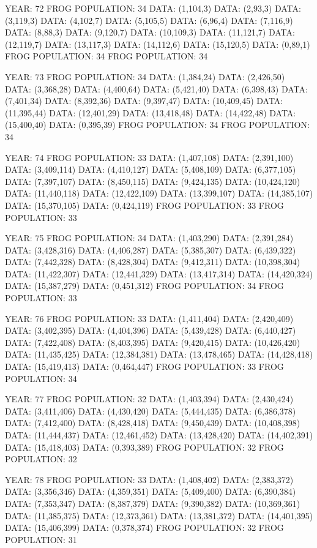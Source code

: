 \documentclass[12pt,a4paper]{article}
\begin{document}
{YEAR: 72
FROG POPULATION: 34
DATA: (1,104,3)
DATA: (2,93,3)
DATA: (3,119,3)
DATA: (4,102,7)
DATA: (5,105,5)
DATA: (6,96,4)
DATA: (7,116,9)
DATA: (8,88,3)
DATA: (9,120,7)
DATA: (10,109,3)
DATA: (11,121,7)
DATA: (12,119,7)
DATA: (13,117,3)
DATA: (14,112,6)
DATA: (15,120,5)
DATA: (0,89,1)
FROG POPULATION: 34
FROG POPULATION: 34

YEAR: 73
FROG POPULATION: 34
DATA: (1,384,24)
DATA: (2,426,50)
DATA: (3,368,28)
DATA: (4,400,64)
DATA: (5,421,40)
DATA: (6,398,43)
DATA: (7,401,34)
DATA: (8,392,36)
DATA: (9,397,47)
DATA: (10,409,45)
DATA: (11,395,44)
DATA: (12,401,29)
DATA: (13,418,48)
DATA: (14,422,48)
DATA: (15,400,40)
DATA: (0,395,39)
FROG POPULATION: 34
FROG POPULATION: 34

YEAR: 74
FROG POPULATION: 33
DATA: (1,407,108)
DATA: (2,391,100)
DATA: (3,409,114)
DATA: (4,410,127)
DATA: (5,408,109)
DATA: (6,377,105)
DATA: (7,397,107)
DATA: (8,450,115)
DATA: (9,424,135)
DATA: (10,424,120)
DATA: (11,440,118)
DATA: (12,422,109)
DATA: (13,399,107)
DATA: (14,385,107)
DATA: (15,370,105)
DATA: (0,424,119)
FROG POPULATION: 33
FROG POPULATION: 33

YEAR: 75
FROG POPULATION: 34
DATA: (1,403,290)
DATA: (2,391,284)
DATA: (3,428,316)
DATA: (4,406,287)
DATA: (5,385,307)
DATA: (6,439,322)
DATA: (7,442,328)
DATA: (8,428,304)
DATA: (9,412,311)
DATA: (10,398,304)
DATA: (11,422,307)
DATA: (12,441,329)
DATA: (13,417,314)
DATA: (14,420,324)
DATA: (15,387,279)
DATA: (0,451,312)
FROG POPULATION: 34
FROG POPULATION: 33

YEAR: 76
FROG POPULATION: 33
DATA: (1,411,404)
DATA: (2,420,409)
DATA: (3,402,395)
DATA: (4,404,396)
DATA: (5,439,428)
DATA: (6,440,427)
DATA: (7,422,408)
DATA: (8,403,395)
DATA: (9,420,415)
DATA: (10,426,420)
DATA: (11,435,425)
DATA: (12,384,381)
DATA: (13,478,465)
DATA: (14,428,418)
DATA: (15,419,413)
DATA: (0,464,447)
FROG POPULATION: 33
FROG POPULATION: 34

YEAR: 77
FROG POPULATION: 32
DATA: (1,403,394)
DATA: (2,430,424)
DATA: (3,411,406)
DATA: (4,430,420)
DATA: (5,444,435)
DATA: (6,386,378)
DATA: (7,412,400)
DATA: (8,428,418)
DATA: (9,450,439)
DATA: (10,408,398)
DATA: (11,444,437)
DATA: (12,461,452)
DATA: (13,428,420)
DATA: (14,402,391)
DATA: (15,418,403)
DATA: (0,393,389)
FROG POPULATION: 32
FROG POPULATION: 32

YEAR: 78
FROG POPULATION: 33
DATA: (1,408,402)
DATA: (2,383,372)
DATA: (3,356,346)
DATA: (4,359,351)
DATA: (5,409,400)
DATA: (6,390,384)
DATA: (7,353,347)
DATA: (8,387,379)
DATA: (9,390,382)
DATA: (10,369,361)
DATA: (11,385,375)
DATA: (12,373,361)
DATA: (13,381,372)
DATA: (14,401,395)
DATA: (15,406,399)
DATA: (0,378,374)
FROG POPULATION: 32
FROG POPULATION: 31

}
\end{document}
